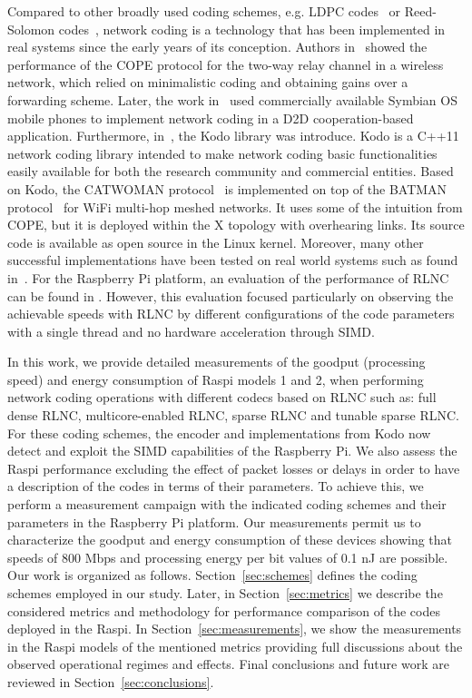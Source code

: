 Compared to other broadly used coding schemes, e.g. \ac{LDPC}
codes~\cite{gallager1962low} or Reed-Solomon
codes~\cite{reed1960polynomial}, network coding is a technology that
has been implemented in real systems since the early years of its
conception. Authors in~\cite{katti2008xors} showed the
performance of the COPE protocol for the two-way relay channel
in a wireless network, which relied on minimalistic coding and obtaining
gains over a forwarding scheme. Later, the work in~\cite{pedersen2008implementation} used commercially available
Symbian OS mobile phones to implement network coding in a
\ac{D2D} cooperation-based application. Furthermore,
in~\cite{kodo2011pedersen}, the Kodo library was introduce. Kodo is
a C++11 network coding library intended to make network coding
basic functionalities easily available for both the research community
and commercial entities. Based on Kodo, the CATWOMAN
protocol~\cite{hundeboll2012catwoman} is implemented on top of the
BATMAN protocol~\cite{johnson2008simple} for WiFi multi-hop meshed
networks. It uses some of the intuition from COPE, but it is deployed
within the X topology with overhearing links. Its source code is available
as open source in the Linux kernel. Moreover, many other successful
implementations have been tested on real world systems such as
found in~\cite{pahlevani2013playncool,krigslund2013core,
paramanathan2013leanandmean}. For the Raspberry Pi platform, an evaluation
of the performance of \ac{RLNC} can be found in \cite{paramanathan2014sharing}.
However, this evaluation focused particularly on observing the achievable
speeds with \ac{RLNC} \cite{ho2006random} by different configurations of
the code parameters with a single thread and no hardware acceleration through
\ac{SIMD}.

In this work, we provide detailed measurements of the goodput (processing
speed) and energy consumption of \ac{Raspi} models 1 and 2, when
performing network coding operations with different codecs based on \ac{RLNC}
such as: full dense \ac{RLNC}, multicore-enabled \ac{RLNC}, sparse \ac{RLNC}
and tunable sparse \ac{RLNC}. For these coding schemes, the encoder and implementations from Kodo now detect and exploit the \ac{SIMD}
capabilities of the Raspberry Pi. We also assess the \ac{Raspi}
performance excluding the effect of packet losses or delays in order to have a
description of the codes in terms of their parameters. To achieve this,
we perform a measurement campaign with the indicated coding schemes and
their parameters in the Raspberry Pi platform. Our measurements permit
us to characterize the goodput and energy consumption
of these devices showing that speeds of 800 Mbps and processing energy per bit
values of 0.1 nJ are possible. Our work is organized as follows.
Section~\ref{sec:schemes} defines the
coding schemes employed in our study. Later, in Section~\ref{sec:metrics}
we describe the considered metrics and methodology for performance comparison
of the codes deployed in the \ac{Raspi}. In Section~\ref{sec:measurements}, we
show the measurements in the \ac{Raspi} models of the mentioned metrics
providing full discussions about the observed operational regimes and effects.
Final conclusions and future work are reviewed in
Section~\ref{sec:conclusions}.

